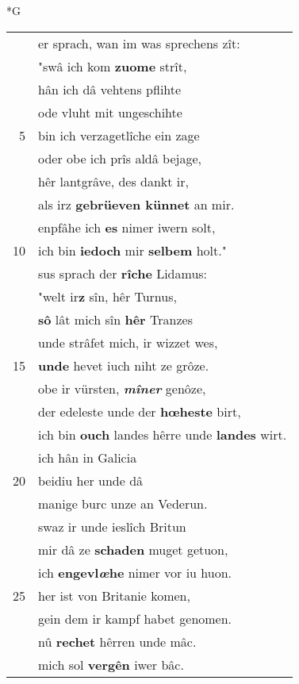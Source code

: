 \documentclass[8pt,a4paper,notitlepage]{article}
\begin{document}
\begin{table}[ht]
\begin{minipage}[t]{0.5\linewidth}
\small
\begin{center}*G
\end{center}
\begin{tabular}{rl}
 & er sprach, wan im was sprechens zît:\\ 
 & "swâ ich kom \textbf{zuome} strît,\\ 
 & hân ich dâ vehtens pflihte\\ 
 & ode vluht mit ungeschihte\\ 
5 & bin ich verzagetlîche ein zage\\ 
 & oder obe ich prîs aldâ bejage,\\ 
 & hêr lantgrâve, des dankt ir,\\ 
 & als irz \textbf{gebrüeven künnet} an mir.\\ 
 & enpfâhe ich \textbf{es} nimer iwern solt,\\ 
10 & ich bin \textbf{iedoch} mir \textbf{selbem} holt."\\ 
 & sus sprach der \textbf{rîche} Lidamus:\\ 
 & "welt ir\textbf{z} sîn, hêr Turnus,\\ 
 & \textbf{sô} lât mich sîn \textbf{hêr} Tranzes\\ 
 & unde strâfet mich, ir wizzet wes,\\ 
15 & \textbf{unde} hevet iuch niht ze grôze.\\ 
 & obe ir vürsten, \textit{\textbf{mîner}} genôze,\\ 
 & der edeleste unde der \textbf{hœheste} birt,\\ 
 & ich bin \textbf{ouch} landes hêrre unde \textbf{landes} wirt.\\ 
 & ich hân in Galicia\\ 
20 & beidiu her unde dâ\\ 
 & manige burc unze an Vederun.\\ 
 & swaz ir unde ieslîch Britun\\ 
 & mir dâ ze \textbf{schaden} muget getuon,\\ 
 & ich \textbf{en}\textbf{gevl\textit{œ}he} nimer vor iu huon.\\ 
25 & her ist von Britanie komen,\\ 
 & gein dem ir kampf habet genomen.\\ 
 & nû \textbf{rechet} hêrren unde mâc.\\ 
 & mich sol \textbf{vergên} iwer bâc.\\ 

\end{tabular}
\end{minipage}
\end{table}
\end{document}
